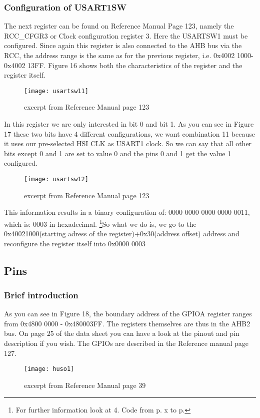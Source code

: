 \documentclass[11pt]{scrartcl}
\begin{document}
\newpage
	\subsubsection{Configuration of USART1SW}
The next register can be found on Reference Manual Page 123, namely the RCC\_CFGR3 or Clock configuration register 3. Here the USARTSW1 must be configured. Since again this register is also connected to the AHB bus via the RCC, the address range is the same as for the previous register, i.e. 0x4002 1000-0x4002 13FF. Figure 16 shows both the characteristics of the register and the register itself. 
\begin{figure}[h]
		\centering
		\texttt{[image: usartsw11]}
		\caption{excerpt from Reference Manual page 123}
\end{figure}
\newline
In this register we are only interested in bit 0 and bit 1. As you can see in Figure 17 these two bits have 4 different configurations, we want combination 11 because it uses our pre-selected HSI CLK as USART1 clock. So we can say that all other bits except 0 and 1 are set to value 0 and the pins 0 and 1 get the value 1 configured.
\begin{figure}[h]
		\centering
		\texttt{[image: usartsw12]}
		\caption{excerpt from Reference Manual page 123}
\end{figure}
\newline
This information results in a binary configuration of: 0000 0000 0000 0000 0011, which is: 0003 in hexadecimal.
\newline\newline
\footnote{\label{foot:17}For further information look at 4. Code from p. x to p.}So what we do is, we go to the 0x40021000(starting adress of the register)+0x30(address offset) address and reconfigure the register itself into 0x0000 0003


\newpage
	\subsection{Pins}
	\subsubsection{Brief introduction}
As you can see in Figure 18, the boundary address of the GPIOA register ranges from 0x4800 0000 - 0x480003FF. The registers themselves are thus in the AHB2 bus. On page 25 of the data sheet you can have a look at the pinout and pin description if you wish. The GPIOs are described in the Reference manual page 127.
\begin{figure}[h]
		\centering
		\texttt{[image: huso1]}
		\caption{excerpt from Reference Manual page 39}
\end{figure}
\end{document}
